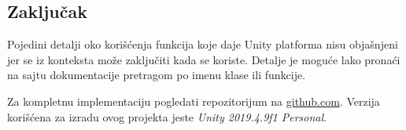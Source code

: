 \pagebreak
\subsection{Zaklju\v{c}ak}

Pojedini detalji oko kori\v{s}\'cenja funkcija koje daje Unity platforma nisu obja\v{s}njeni jer se iz konteksta
mo\v{z}e zaklju\v{c}iti kada se koriste. Detalje je mogu\'ce lako prona\'ci na sajtu dokumentacije pretragom po imenu
klase ili funkcije. 

Za kompletnu implementaciju pogledati repozitorijum na \href{http://github.com/rtojagic/andromeda}{github.com}. 
Verzija kori\v{s}\'cena za izradu ovog projekta jeste \emph{Unity 2019.4.9f1 Personal}.